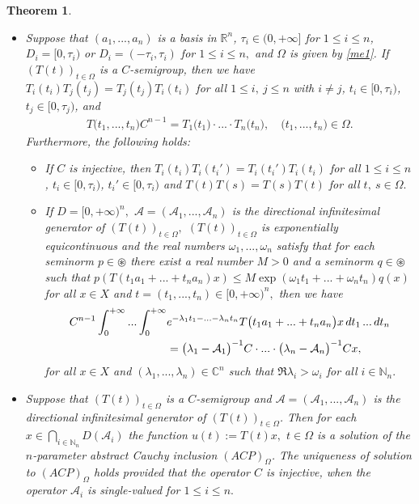 \documentclass[10pt,a4paper]{amsart}
\newtheorem{thm}{Theorem}
\begin{document}
\begin{thm}\label{tucko1}
\begin{itemize}
\item[(i)] Suppose that $(a_{1},...,a_{n})$ is a basis in ${\mathbb R}^{n}$, $\tau_{i}\in (0,+\infty]$ for $1\leq i \leq n$, $D_{i}=[0,\tau_{i})$ or $D_{i}=(-\tau_{i},\tau_{i})$ for $1\leq i\leq n,$ 
and $\Omega$ is given by \eqref{me1}. If $(T(t))_{t\in \Omega} $ 
is a $C$-semigroup, then we have $T_{i}(t_{i})T_{j}(t_{j})=T_{j}(t_{j})T_{i}(t_{i})$ for all $1\leq i,\ j\leq n$ with $i\neq j$, $t_{i}\in [0,\tau_{i})$, $t_{j}\in [0,\tau_{j})$, and
\begin{align}\label{345}
T\bigl(t_{1},...,t_{n}\bigr)C^{n-1}=T_{1}\bigl(t_{1}\bigr) \cdot ... \cdot T_{n}\bigl(t_{n}\bigr),\quad \bigl(t_{1},...,t_{n}\bigr) \in \Omega.
\end{align}
Furthermore, the following holds:
\begin{itemize}
\item[(a)] If $C$ is injective, then $T_{i}(t_{i})T_{i}(t_{i}')=T_{i}(t_{i}')T_{i}(t_{i})$ for all $1\leq i\leq n$, $t_{i}\in [0,\tau_{i})$, $t_{i}'\in [0,\tau_{i})$ and $T(t)T(s)=T(s)T(t)$ for all $t,\ s\in \Omega.$
\item[(b)]
If $D=[0,+\infty)^{n},$ ${\mathcal A}=({\mathcal A}_{1},...,{\mathcal A}_{n})$ is the directional infinitesimal generator of $(T(t))_{t\in \Omega},$ $(T(t))_{t\in \Omega}$ is exponentially equicontinuous and the real numbers $\omega_{1},..., \omega_{n}$ satisfy that for each seminorm $p\in \circledast$ there exist a real number $M>0$ and a seminorm $q\in \circledast$ such that $p(T(t_{1}a_{1}+...+t_{n}a_{n})x)\leq M\exp(\omega_{1}t_{1}+...+\omega_{n}t_{n})q(x)$ for all $x\in X$ and $t=(t_{1},...,t_{n})\in [0,+\infty)^{n},$ then we have
\begin{align}\notag
C^{n-1} \int^{+\infty}_{0}...\int^{+\infty}_{0}& e^{-\lambda_{1}t_{1}-...-\lambda_{n}t_{n}}T\bigl(t_{1}a_{1}+...+t_{n}a_{n}\bigr)x\, dt_{1}\, ...\, dt_{n}
\\&  \label{345621}=\bigl( \lambda_{1}-{\mathcal A}_{1}\bigr)^{-1}C\cdot ... \cdot \bigl( \lambda_{n}-{\mathcal A}_{n}\bigr)^{-1}Cx,
\end{align}
for all $x\in X$ and $(\lambda_{1},...,\lambda_{n})\in {\mathbb C}^{n}$ such that $\Re \lambda_{i}>\omega_{i}$ for all $i\in {\mathbb N}_{n}.$
\end{itemize}
\item[(ii)] Suppose that 
$(T(t))_{t\in \Omega} $ 
is a $C$-semigroup and ${\mathcal A}=({\mathcal A}_{1},...,{\mathcal A}_{n})$ is the directional infinitesimal generator of $(T(t))_{t\in \Omega}$. Then for each $ x\in \bigcap_{i\in {\mathbb N}_{n}}D( {\mathcal A} _{i})$ the function $u(t):=T(t)x,$ $t\in \Omega $ is a   solution of the $n$-parameter abstract Cauchy inclusion $(ACP)_{\Omega}$.  The uniqueness of solution to $(ACP)_{\Omega}$ holds provided that the operator $C$ is injective, when the operator ${\mathcal A}_{i}$ is single-valued for $1\leq i \leq n.$
\end{itemize}
\end{thm}
\end{document}
